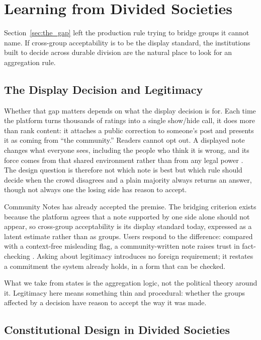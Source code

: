 \documentclass[10pt,twocolumn]{article}
\begin{document}
\section{Learning from Divided Societies}
\label{sec:learning}

Section~\ref{sec:the_gap} left the production rule trying to bridge groups it
cannot name. If cross-group acceptability is to be the display standard, the
institutions built to decide across durable division are the natural place to
look for an aggregation rule.

\subsection*{The Display Decision and Legitimacy}

Whether that gap matters depends on what the display decision is for. Each time
the platform turns thousands of ratings into a single show/hide call, it does
more than rank content: it attaches a public correction to someone's post and
presents it as coming from ``the community.'' Readers cannot opt out. A
displayed note changes what everyone sees, including the people who think it is
wrong, and its force comes from that shared environment rather than from any
legal power \citep{klonick2018governors}. The design question is therefore not
which note is best but which rule should decide when the crowd disagrees \textemdash{}
and a plain majority always returns an answer, though not always one the losing
side has reason to accept.

Community Notes has already accepted the premise. The bridging criterion exists
because the platform agrees that a note supported by one side alone should not
appear, so cross-group acceptability is its display standard today, expressed as
a latent estimate rather than as groups. Users respond to the difference:
compared with a context-free misleading flag, a community-written note raises
trust in fact-checking \citep{drolsbach2024trust}. Asking about legitimacy
introduces no foreign requirement; it restates a commitment the system already
holds, in a form that can be checked.

What we take from states is the aggregation logic, not the political theory
around it. Legitimacy here means something thin and procedural: whether the
groups affected by a decision have reason to accept the way it was made.

\subsection*{Constitutional Design in Divided Societies}
\end{document}
